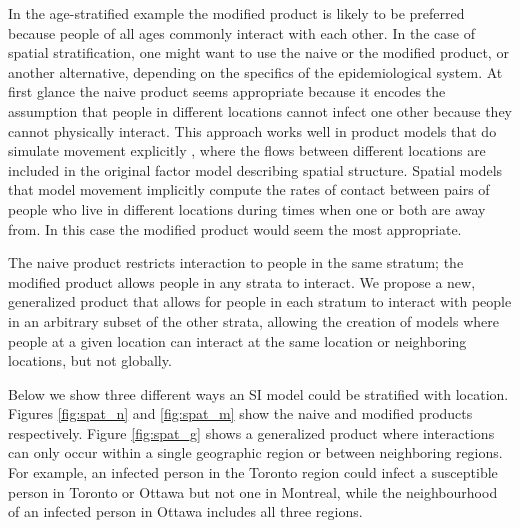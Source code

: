 In the age-stratified example the modified product is likely to be preferred because people of all ages commonly interact with each other. In the case of spatial stratification, one might want to use the naive or the modified product, or another alternative, depending on the specifics of the epidemiological system. At first glance the naive product seems appropriate because it encodes the assumption that people in different locations cannot infect one other because they cannot physically interact. This approach works well in product models that do simulate movement explicitly \cite[e.g.][]{mohammadi2023importation}, where the flows between different locations are included in the original factor model describing spatial structure. Spatial models that model movement implicitly \citep{dietz1995structured} compute the rates of contact between pairs of people who live in different locations during times when one or both are away from. In this case the modified product would seem the most appropriate.


The naive product restricts interaction to people in the same stratum; the modified product allows people in any strata to interact. We propose a new, generalized product that allows for people in each stratum to interact with people in an arbitrary subset of the other strata, allowing the creation of models where people at a given location can interact at the same location or neighboring locations, but not globally.


Below we show three different ways an SI model could be stratified with location. Figures \ref{fig:spat_n} and \ref{fig:spat_m} show the naive and modified products respectively. Figure \ref{fig:spat_g} shows a generalized product where interactions can only occur within a single geographic region or between neighboring regions. For example, an infected person in the Toronto region could infect a susceptible person in Toronto or Ottawa but not one in Montreal, while the neighbourhood of an infected person in Ottawa includes all three regions.

